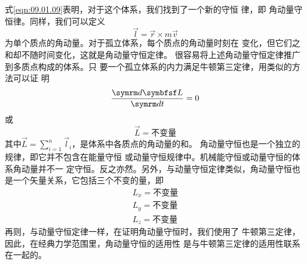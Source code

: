 式\eqref{eqn:09.01.09}表明，对于这个体系，我们找到了一个新的守恒
律，即
角动量守恒律。同样，我们可以定义
\begin{equation}\label{eqn:09.01.10}
  \vec{l} = \vec{r} \times m \vec{v}
\end{equation}
为单个质点的角动量。对于孤立体系，每个质点的角动量时刻在
变化，但它们之和却不随时间变化，这就是角动量守恒定律。
很容易将上述角动量守恒定律推广到多质点构成的体系。只
要一个孤立体系的内力满足牛顿第三定律，用类似的方法可以证
明
\begin{equation*}
  \frac { \dif \vec{L} } { \dif t } = 0
\end{equation*}
或%
\begin{equation}\label{eqn:09.01.11}
  \vec{L}=\text{不变量}
\end{equation}
其中$\displaystyle \vec{L}=\sum_{i=1}^{n} \vec{l}_i$，是体系中各质点的角动量的和。
角动量守恒也是一个独立的规律，即它并不包含在能量守恒
或动量守恒规律中。机械能守恒或动量守恒的体系角动量并不一
定守恒。反之亦然。另外，与动量守恒定律类似，角动量守恒也
是一个矢量关系，它包括三个不变的量，即
\begin{equation}\label{eqn:09.01.12}
  \begin{aligned}
    L _ { x } = \text{不变量} \\
    L _ { y } = \text{不变量} \\
    L _ { z } = \text{不变量}
  \end{aligned}
\end{equation}
再则，与动量守恒定律一样，在证明角动量守恒时，我们使用了
牛顿第三定律，因此，在经典力学范围里，角动量守恒的适用性
是与牛顿第三定律的适用性联系在一起的。
